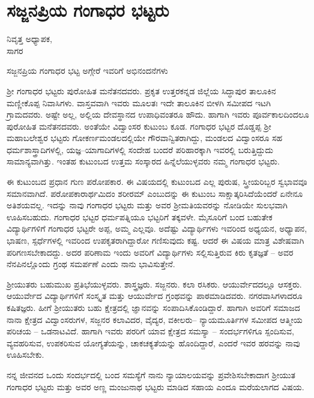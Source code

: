 \chapter{ಸಜ್ಜನಪ್ರಿಯ ಗಂಗಾಧರ ಭಟ್ಟರು}

\begin{center}
\smallskip

ನಿವೃತ್ತ ಅಧ್ಯಾಪಕ,\\ 
ಸಾಗರ
\addrule
\end{center}

ಸಜ್ಜನಪ್ರಿಯ ಗಂಗಾಧರ ಭಟ್ಟ ಅಗ್ಗೇರೆ ಇವರಿಗೆ ಅಭಿನಂದನೆಗಳು

ಶ್ರೀ ಗಂಗಾಧರ ಭಟ್ಟರು ಪುರೋಹಿತ ಮನೆತನದವರು. ಪ್ರಕೃತ  ಉತ್ತರಕನ್ನಡ ಜಿಲ್ಲೆಯ ಸಿದ್ಧಾಪುರ ತಾಲೂಕಿನ ಮಣ್ಣೀಕೊಪ್ಪ ನಿವಾಸಿಗಳು. ವಾಸ್ತವವಾಗಿ ಇವರು ಮೂಲತಃ ಇದೇ ತಾಲೂಕಿನ ಬೀಳಗಿ ಸಮೀಪದ ಇಟಗಿ ಗ್ರಾಮದವರು. ಅಷ್ಟೇ ಅಲ್ಲ, ಅಲ್ಲಿಯ ದೇವಸ್ಥಾನದ ಉಪಾಧಿವಂತರೂ ಹೌದು. ಹಾಗಾಗಿ ಇವರು ಪೂರ್ವಕಾಲದಿಂದಲೂ ಪುರೋಹಿತ ಮನೆತನದವರು. ಅಂತೆಯೇ ವಿದ್ವಾಂಸರ ಕುಟುಂಬ ಕೂಡ. ಗಂಗಾಧರ ಭಟ್ಟರ ದೊಡ್ಡಪ್ಪ ಶ್ರೀ ಮಹಾಬಲೇಶ್ವರ ಭಟ್ಟರು ಗೋಕರ್ಣಮಂಡಲದಲ್ಲಿಯೇ ಗೌರವಾನ್ವಿತರಾಗಿದ್ದು, ಮಂಡಲದ ವಿದ್ವಾಂಸರೂ ಸಹ ಧರ್ಮಶಾಸ್ತ್ರಾದಿಗಳಲ್ಲಿ, ಯಜ್ಞ–ಯಾಗಾದಿಗಳಲ್ಲಿ ಸಂದೇಹ ಬಂದರೆ ಪರಿಹಾರಕ್ಕಾಗಿ ಇವರಲ್ಲಿ ಬರುತ್ತಿದ್ದುದು ಸಾಮಾನ್ಯವಾಗಿತ್ತು. ಇಂತಹ ಕುಟುಂಬದ ಉತ್ತಮ ಸಂಸ್ಕಾರದ ಹಿನ್ನೆಲೆಯುಳ್ಳವರು ನಮ್ಮ ಗಂಗಾಧರ ಭಟ್ಟರು.

ಈ ಕುಟುಂಬದ ಪ್ರಧಾನ ಗುಣ ಪರೋಪಕಾರ. ಈ ವಿಷಯದಲ್ಲಿ ಕುಟುಂಬದ ಎಲ್ಲ ಪುರುಷ, ಸ್ತ್ರೀಯರಿಬ್ಬರ ಸ್ವಭಾವವೂ ಸಮಾನವಾಗಿದೆ. ಪರೋಪಕಾರಾರ್ಥಮಿದಂ ಶರೀರಮ್ ಎಂಬುದನ್ನು ಈ ಕುಟುಂಬ ಸಾಕ್ಷಾತ್ಕರಿಸಿದೆಯೆಂದರೆ ಏನೇನೂ ಅತಿಶಯವಲ್ಲ. ಇದನ್ನು ನಾವು ಗಂಗಾಧರ ಭಟ್ಟರು ಮತ್ತು ಅವರ ಶ್ರೀಮತಿಯವರನ್ನು ನೋಡಿಯೇ ಸುಲಭವಾಗಿ ಊಹಿಸಬಹುದು. ಗಂಗಾಧರ ಭಟ್ಟರ ಧರ್ಮಪತ್ನಿಯೂ ಭಟ್ಟರಿಗೆ ತಕ್ಕವಳೇ. ಮೈಸೂರಿಗೆ ಬಂದ ಬಹುತೇಕ ವಿದ್ಯಾರ್ಥಿಗಳಿಗೆ ಗಂಗಾಧರ ಭಟ್ಟರೇ ಅಪ್ಪ, ಅಮ್ಮ ಎಲ್ಲವೂ. ಅದೆಷ್ಟು ವಿದ್ಯಾರ್ಥಿಗಳು ಇವರಿಂದ ಅಧ್ಯಯನ, ಅಧ್ಯಾಪನ, ಭಾಷಣ, ಸ್ಪರ್ಧೆಗಳಲ್ಲಿ ಇವರಿಂದ ಉಪಕೃತರಾಗಿದ್ದಾರೋ ಗಣಿಸುವುದು ಕಷ್ಟ. ಆದರೆ ಈ ವಿಷಯ ಮಾತ್ರ ವಿಶೇಷವಾಗಿ ಪರಿಗಣಸಬೇಕಾದದ್ದು. ಅದರ ಪರಿಣಾಮ ಇಂದು ಅವರಿಗೆ ವಿದ್ಯಾರ್ಥಿಗಳು ಸಲ್ಲಿಸುತ್ತಿರುವ ಕಿರು ಕೃತಜ್ಞತೆ – ಅವರ ನೆನಪಿನಲ್ಲೊಂದು ಗ್ರಂಥ ಸಮರ್ಪಣೆ ಎಂದು ನಾನು ಭಾವಿಸುತ್ತೇನೆ.

ಶ್ರೀಯುತರು ಬಹುಮುಖ ಪ್ರತಿಭೆಯುಳ್ಳವರು. ಶಾಸ್ತ್ರಜ್ಞರು. ಸಜ್ಜನರು. ಕಲಾ ರಸಿಕರು. ಆಯುರ್ವೇದದಲ್ಲೂ ಆಸಕ್ತರು. ಆಯುರ್ವೇದ ವಿದ್ಯಾರ್ಥಿಗಳಿಗೆ ಸಂಸ್ಕೃತ ಮತ್ತು ಆಯುರ್ವೇದ ಗ್ರಂಥವನ್ನು ಪಾಠಮಾಡಿದವರು. ನಗರವಾಸಿಗಳಾದರೂ ಕಷಿತಜ್ಞರು. ಹೀಗೆ ಶ್ರೀಯುತರು ಬಹು ಕ್ಷೇತ್ರದಲ್ಲಿ ಜ್ಞಾನವನ್ನು ಸಂಪಾದಿಸಿಕೊಂಡಿದ್ದಾರೆ. ಹಾಗಾಗಿ ಅವರಿಗೆ ಸಮಾಜದ ನಾನಾ ಕ್ಷೇತ್ರದ ವಿದ್ವಾಂಸರುಗಳ, ಸಜ್ಜನರ ಕಲಾವಿದರ, ವೈದ್ಯರ, ವಕೀಲರು– ನ್ಯಾಯಮೂರ್ತಿಗಳ ಸಮೀಪದ ಆತ್ಮೀಯ ಪರಿಚಯ – ಒಡನಾಟವಿದೆ. ಹಾಗಾಗಿ ಇವರು ಪರರಿಗೆ ಯಾವ ಕ್ಷೇತ್ರದ ಸಮಸ್ಯಾ – ಸಂದರ್ಭಗಳಿಗೂ ಸ್ಪಂದಿಸುವ, ವ್ಯವಹರಿಸುವ, ಉಪಕರಿಸುವ ಯೋಗ್ಯತೆಯನ್ನು, ಚಾಕಚಕ್ಯತೆಯನ್ನು ಹೊಂದಿದ್ದಾರೆ, ಎಂದರೆ ಇವರ ಹರವನ್ನು ನಾವು ಊಹಿಸಬೇಕು. 

ನನ್ನ ಜೀವನದ ಒಂದು ಸಂದರ್ಭದಲ್ಲಿ  ಬಂದ ಸಮಸ್ಯೆಗೆ ನಾನು ನ್ಯಾಯಾಲಯವನ್ನು ಪ್ರವೇಶಿಸಬೇಕಾದಾಗ ಶ್ರೀಯುತ ಗಂಗಾಧರ ಭಟ್ಟರು ಮತ್ತು ಅವರ ಅಣ್ಣ ಮಂಜುನಾಥ ಭಟ್ಟರು ಮಾಡಿದ ಸಹಾಯ ಎಂದೂ ಮರೆಯಲಾಗದ ವಿಷಯ.

